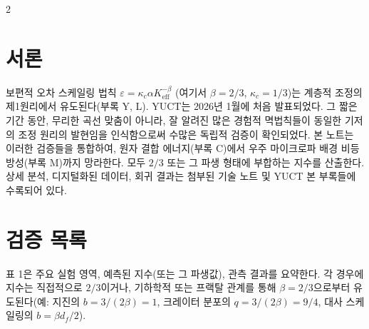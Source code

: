 \documentclass[11pt,a4paper]{article}
\newcommand{\eps}{\varepsilon}
\newcommand{\kappac}{\kappa_c}
\newcommand{\Keff}{K_{\mathrm{eff}}}
\newcommand{\betaf}{\beta}
\begin{document}
	\vspace{0.4cm}
	\vspace*{-\baselineskip}
	\begin{multicols}{2}
		
		\section{서론}
		
		보편적 오차 스케일링 법칙 \(\eps = \kappac \alpha \Keff^{-\betaf}\) (여기서 \(\betaf = 2/3\), \(\kappac = 1/3\))는 계층적 조정의 제1원리에서 유도된다(부록 Y, L). YUCT는 2026년 1월에 처음 발표되었다. 그 짧은 기간 동안, 무리한 곡선 맞춤이 아니라, 잘 알려진 많은 경험적 멱법칙들이 동일한 기저의 조정 원리의 발현임을 인식함으로써 수많은 독립적 검증이 확인되었다. 본 노트는 이러한 검증들을 통합하여, 원자 결합 에너지(부록 C)에서 우주 마이크로파 배경 비등방성(부록 M)까지 망라한다. 모두 \(2/3\) 또는 그 파생 형태에 부합하는 지수를 산출한다. 상세 분석, 디지털화된 데이터, 회귀 결과는 첨부된 기술 노트 \cite{TN1,TN2,TN3,TN4,TN5} 및 YUCT 본 부록들에 수록되어 있다.
		
		\section{검증 목록}
		
		표 1은 주요 실험 영역, 예측된 지수(또는 그 파생값), 관측 결과를 요약한다. 각 경우에 지수는 직접적으로 \(2/3\)이거나, 기하학적 또는 프랙탈 관계를 통해 \(\betaf = 2/3\)으로부터 유도된다(예: 지진의 \(b = 3/(2\betaf) = 1\), 크레이터 분포의 \(q = 3/(2\betaf) = 9/4\), 대사 스케일링의 \(b = \betaf d_f/2\)).
		

\end{multicols}
\end{document}
